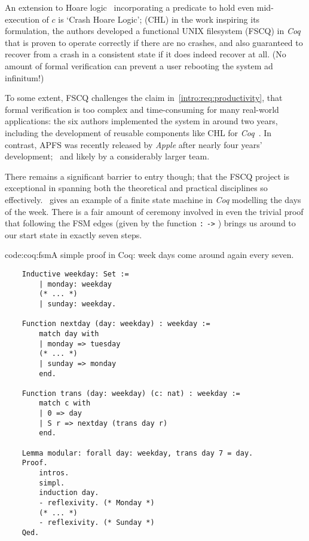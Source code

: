 An extension to Hoare logic~ incorporating a predicate to hold even mid-execution of $c$ is `Crash Hoare Logic'; (CHL) in the work inspiring its formulation, the authors developed a functional UNIX filesystem (FSCQ) in \emph{Coq} that is proven to operate correctly if there are no crashes, and also guaranteed to recover from a crash in a consistent state if it does indeed recover at all. \cite{fscq} (No amount of formal verification can prevent a user rebooting the system ad infinitum!)

To some extent, FSCQ challenges the claim in~\cref{intro:req:productivity}, that formal verification is too complex and time-consuming for many real-world applications: the six authors implemented the system in around two years, including the development of reusable components like CHL for \emph{Coq}~\cite{fscq}. In contrast, APFS was recently released by \emph{Apple} after nearly four years' development;~\cite{apfs_detail} and likely by a considerably larger team.

There remains a significant barrier to entry though; that the FSCQ project is exceptional in spanning both the theoretical and practical disciplines so effectively.~\cite{soft_eng_possible}  gives an example of a finite state machine in \emph{Coq} modelling the days of the week. There is a fair amount of ceremony involved in even the trivial proof that following the FSM edges (given by the function \texttt{:}  \texttt{->} ) brings us around to our start state in exactly seven steps.

\begin{codelisting}{code:coq:fsm}{A simple proof in Coq: week days come around again every seven.}
\begin{spacing}{\codespacing}
\begin{verbatim}
    Inductive weekday: Set :=
        | monday: weekday
        (* ... *)
        | sunday: weekday.
    
    Function nextday (day: weekday) : weekday :=
        match day with
        | monday => tuesday
        (* ... *)
        | sunday => monday
        end.
    
    Function trans (day: weekday) (c: nat) : weekday :=
        match c with
        | 0 => day
        | S r => nextday (trans day r)
        end.
    
    Lemma modular: forall day: weekday, trans day 7 = day.
    Proof.
        intros.
        simpl.
        induction day.
        - reflexivity. (* Monday *)
        (* ... *)
        - reflexivity. (* Sunday *)
    Qed.
\end{verbatim}
\end{spacing}
\end{codelisting}

